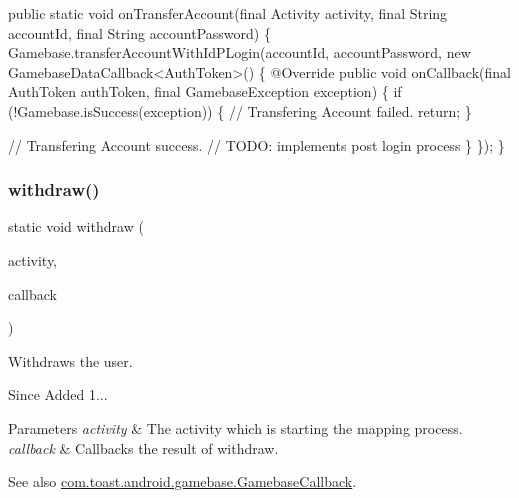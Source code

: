 \begin{DoxyCode}
\textcolor{keyword}{public} \textcolor{keyword}{static} \textcolor{keywordtype}{void} onTransferAccount(\textcolor{keyword}{final} Activity activity, \textcolor{keyword}{final} String accountId, \textcolor{keyword}{final} String 
      accountPassword) \{
    Gamebase.transferAccountWithIdPLogin(accountId, accountPassword, \textcolor{keyword}{new} GamebaseDataCallback<AuthToken>() 
      \{
        @Override
        \textcolor{keyword}{public} \textcolor{keywordtype}{void} onCallback(\textcolor{keyword}{final} AuthToken authToken, \textcolor{keyword}{final} GamebaseException exception) \{
            \textcolor{keywordflow}{if} (!Gamebase.isSuccess(exception)) \{
                \textcolor{comment}{// Transfering Account failed.}
                \textcolor{keywordflow}{return};
            \}

            \textcolor{comment}{// Transfering Account success.}
            \textcolor{comment}{// TODO: implements post login process}
        \}
    \});
\}
\end{DoxyCode}
 \mbox{\label{classcom_1_1toast_1_1android_1_1gamebase_1_1_gamebase_aaa0ce688f5b145c64fb3cc3ec7d496c7}} 
\subsubsection{\texorpdfstring{withdraw()}{withdraw()}}
{\footnotesize\ttfamily static void withdraw (\begin{DoxyParamCaption}\item[{@Non\+Null final Activity}]{activity,  }\item[{@Nullable final \hyperlink{interfacecom_1_1toast_1_1android_1_1gamebase_1_1_gamebase_callback}{Gamebase\+Callback}}]{callback }\end{DoxyParamCaption})\hspace{0.3cm}{\ttfamily [static]}}



Withdraws the user. 

\begin{DoxySince}{Since}
Added 1... 
\end{DoxySince}

\begin{DoxyParams}{Parameters}
{\em activity} & The activity which is starting the mapping process. \\
\hline
{\em callback} & Callbacks the result of withdraw. \\
\hline
\end{DoxyParams}
\begin{DoxySeeAlso}{See also}
\hyperlink{interfacecom_1_1toast_1_1android_1_1gamebase_1_1_gamebase_callback}{com.\+toast.\+android.\+gamebase.\+Gamebase\+Callback}. 
\end{DoxySeeAlso}
